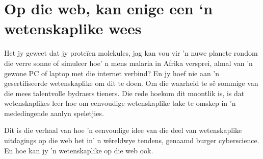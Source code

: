 \section{Op die web, kan enige een ‘n wetenskaplike wees}
Het jy geweet dat jy proteïen molekules, jag kan vou vir 'n nuwe planete rondom die verre sonne of simuleer hoe' n mens malaria in Afrika versprei, almal van 'n gewone PC of laptop met die internet verbind? En jy hoef nie aan 'n gesertifiseerde wetenskaplike om dit te doen. Om die waarheid te sê sommige van die mees talentvolle bydraers tieners. Die rede hoekom dit moontlik is, is dat wetenskaplikes leer hoe om eenvoudige wetenskaplike take te omskep in 'n mededingende aanlyn speletjies. \par

Dit is die verhaal van hoe 'n eenvoudige idee van die deel van wetenskaplike uitdagings op die web het in' n wêreldwye tendens, genaamd burger cyberscience. En hoe kan jy 'n wetenskaplike op die web ook. 


